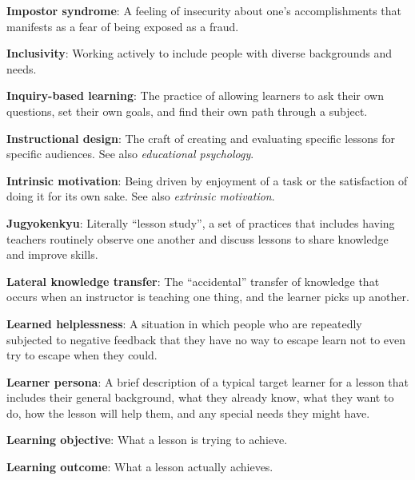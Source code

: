 \textbf{\hypertarget{g:impostor-syndrome}{Impostor syndrome}\label{g:impostor-syndrome}}: A feeling of
insecurity about one's accomplishments that manifests as a fear of being
exposed as a fraud.

\textbf{\hypertarget{g:inclusivity}{Inclusivity}\label{g:inclusivity}}: Working actively to include
people with diverse backgrounds and needs.

\textbf{\hypertarget{g:inquiry-based-learning}{Inquiry-based learning}\label{g:inquiry-based-learning}}: The
practice of allowing learners to ask their own questions, set their own
goals, and find their own path through a subject.

\textbf{\hypertarget{g:instructional-design}{Instructional design}\label{g:instructional-design}}: The craft of
creating and evaluating specific lessons for specific audiences. See
also \emph{educational psychology}.

\textbf{\hypertarget{g:intrinsic-motivation}{Intrinsic motivation}\label{g:intrinsic-motivation}}: Being driven
by enjoyment of a task or the satisfaction of doing it for its own sake.
See also \emph{extrinsic motivation}.

\textbf{\hypertarget{g:jugyokenkyu}{Jugyokenkyu}\label{g:jugyokenkyu}}: Literally ``lesson study'', a set
of practices that includes having teachers routinely observe one another
and discuss lessons to share knowledge and improve skills.

\textbf{\hypertarget{g:lateral-knowledge-transfer}{Lateral knowledge transfer}\label{g:lateral-knowledge-transfer}}:
The ``accidental'' transfer of knowledge that occurs when an instructor is
teaching one thing, and the learner picks up another.

\textbf{\hypertarget{g:learned-helplessness}{Learned helplessness}\label{g:learned-helplessness}}: A situation
in which people who are repeatedly subjected to negative feedback that
they have no way to escape learn not to even try to escape when they
could.

\textbf{\hypertarget{g:learner-persona}{Learner persona}\label{g:learner-persona}}: A brief description of
a typical target learner for a lesson that includes their general
background, what they already know, what they want to do, how the lesson
will help them, and any special needs they might have.

\textbf{\hypertarget{g:learning-objective}{Learning objective}\label{g:learning-objective}}: What a lesson is
trying to achieve.

\textbf{\hypertarget{g:learning-outcome}{Learning outcome}\label{g:learning-outcome}}: What a lesson
actually achieves.


